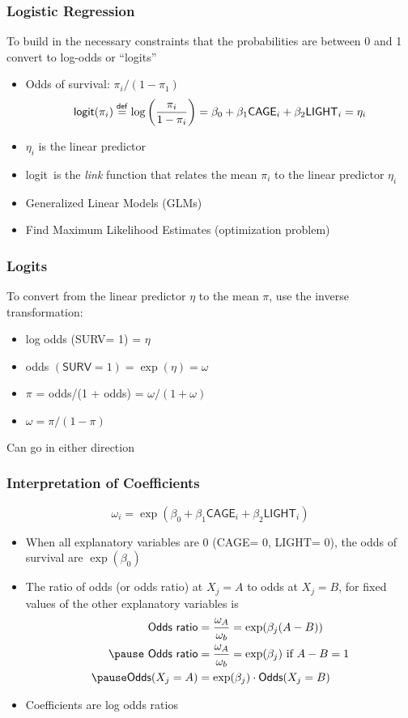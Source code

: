 \documentclass[]{beamer}
\def\logit{\textsf{logit}}
\def\C{\textsf{CAGE}}
\def\L{\textsf{LIGHT}}
\def\S{\textsf{SURV}}
\begin{document}
\begin{frame}\frametitle{Logistic Regression}
To build in the necessary constraints that the probabilities are
between 0 and 1 convert to log-odds or ``logits'' \pause
\begin{itemize}
\item Odds of survival: $\pi_i/(1 - \pi_1)$ \pause
$$ \logit(\pi_i) \stackrel{\sf def}{=} \log\left(\frac {\pi_i} {1 -
    \pi_i} \right) = \beta_0 + \beta_1 \C_i + \beta_2 \L_i = \eta_i$$ \pause
\item $\eta_i$ is the linear predictor \pause
\item \logit\  is the {\it link} function that relates the mean $\pi_i$
  to the linear predictor $\eta_i$ \pause
\item Generalized Linear Models (GLMs) \pause
\item Find Maximum Likelihood Estimates (optimization problem)
\end{itemize}
  
\end{frame}
\begin{frame}\frametitle{Logits}
To convert from the linear predictor $\eta$ to the mean $\pi$,
  use the inverse transformation: \pause
  \begin{itemize}
\item log odds (\S = 1) = $\eta$ \pause
\item odds $(\S = 1) = \exp(\eta) = \omega$ \pause
\item $\pi$ = odds/(1 + odds) = $\omega/(1 + \omega)$ \pause
\item $\omega = \pi/(1 - \pi)$ \pause
  \end{itemize}
Can go in either direction
\end{frame}
\begin{frame}\frametitle{Interpretation of Coefficients}
$$\omega_i = \exp(\beta_0 + \beta_1 \C_i + \beta_2 \L_i)$$ \pause
\begin{itemize}
\item When all explanatory variables are 0 (\C = 0, \L = 0), the odds
  of survival are $\exp(\beta_0)$ \pause
\item The ratio of odds (or odds ratio) at $X_j = A$ to odds at $X_j =
  B$, for fixed values of the other explanatory variables is 
  \begin{align*}
   \textsf{ Odds ratio} &= \frac{\omega_A}{\omega_b}  = \exp(\beta_j
   (A - B)) \\  \pause
 \textsf{ Odds ratio} &= \frac{\omega_A}{\omega_b}  = \exp(\beta_j)
   \text{ if } A - B = 1\\ \pause
\textsf{Odds}(X_j = A) &= \exp(\beta_j) \cdot \textsf{Odds}(X_j = B) 
  \end{align*}
\item Coefficients are log odds ratios \pause
\end{itemize}
\end{frame}
\end{document}
